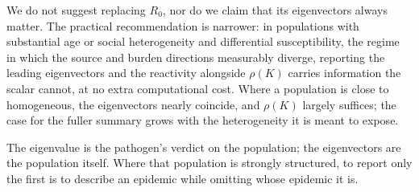 \documentclass[12pt]{article}
\begin{document}
We do not suggest replacing $R_0$, nor do we claim that its eigenvectors always matter. The practical recommendation is narrower: in populations with substantial age or social heterogeneity and differential susceptibility, the regime in which the source and burden directions measurably diverge, reporting the leading eigenvectors and the reactivity alongside $\rho(K)$ carries information the scalar cannot, at no extra computational cost. Where a population is close to homogeneous, the eigenvectors nearly coincide, and $\rho(K)$ largely suffices; the case for the fuller summary grows with the heterogeneity it is meant to expose.

The eigenvalue is the pathogen's verdict on the population; the eigenvectors are the population itself. Where that population is strongly structured, to report only the first is to describe an epidemic while omitting whose epidemic it is.
\end{document}

